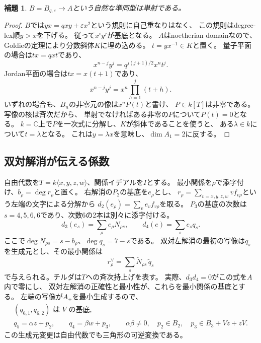 \documentclass[11pt,a4paper]{ltjsarticle}
\newtheorem{lemma}[theorem]{補題}
\theoremstyle{definition}
\begin{document}
\begin{lemma}\label{lem:plane-embedding}
$B=B_{q,\varepsilon}\to A$という自然な準同型は単射である。
\end{lemma}
\begin{proof}
$B$では$yx=qxy+\varepsilon x^2$という規則に自己重なりはなく、
この規則はdegree-lex順$y>x$を下げる。
従って$x^iy^j$が基底となる。
$A$はnoetherian domainなので、Goldieの定理により分数斜体$K$に埋め込める。
$t=yx^{-1}\in K$と置く。
量子平面の場合は$tx=qxt$であり、
\[
x^{n-j}y^j=q^{j(j+1)/2}x^n t^j.
\]
Jordan平面の場合は$tx=x(t+1)$であり、
\[
x^{n-j}y^j=x^n\prod_{h=1}^{j}(t+h).
\]
いずれの場合も、$B_n$の非零元の像は$x^nP(t)$と書け、
$P\in k[T]$は非零である。写像の核は斉次だから、
単射でなければある非零の$P$について$P(t)=0$となる。
$k=\mathbb C$上で$P$を一次式に分解し、$K$が斜体であることを使うと、
ある$\lambda\in k$について$t=\lambda$となる。
これは$y=\lambda x$を意味し、$\dim A_1=2$に反する。
\end{proof}

\subsection{双対解消が伝える係数}\label{subsec:dual-coefficient}
自由代数を$T=k\langle x,y,z,w\rangle$、関係イデアルを$I$とする。
最小関係を$\rho$で添字付け、$b_\rho=\deg r_\rho$と置く。
右解消の$P_2$の基底を$e_\rho$とし、
$r_\rho=\sum_{v=x,y,z,w}v f_{v\rho}$という左端の文字による分解から
$d_2(e_\rho)=\sum_v e_v f_{v\rho}$を取る。
$P_3$の基底の次数は$s=4,5,6,6$であり、次数6の2本は別々に添字付ける。
\[
d_3(e_s)=\sum_\rho e_\rho N_{\rho s},\qquad
d_4(e)=\sum_s e_s q_s.
\]
ここで$\deg N_{\rho s}=s-b_\rho$、$\deg q_s=7-s$である。
双対左解消の最初の写像は$q_s$を生成元とし、その最小関係は
\begin{equation}\label{eq:dual-relations}
r^\vee_\rho=\sum_s \widetilde N_{\rho s}\,\widetilde q_s
\end{equation}
で与えられる。チルダは$T$への斉次持上げを表す。
実際、$d_3d_4=0$がこの式を$A$内で零にし、
双対左解消の正確性と最小性が、これらを最小関係の基底とする。
左端の写像が$A_+$を最小生成するので、
\begin{equation}\label{eq:dual-generators}
\begin{gathered}
(q_{6,1},q_{6,2})\text{ は }V\text{ の基底},\\
q_5=\alpha z+p_2,\qquad q_4=\beta w+p_3,\qquad
\alpha\beta\ne0,\quad
p_2\in B_2,\quad p_3\in B_3+Vz+zV.
\end{gathered}
\end{equation}
この生成元変更は自由代数でも三角形の可逆変換である。
\end{document}
